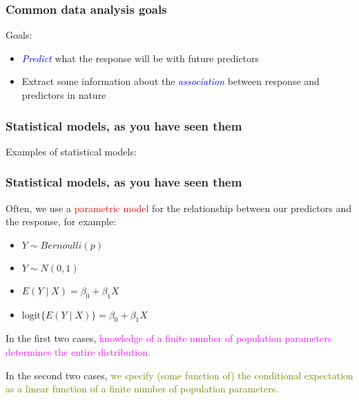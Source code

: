 \documentclass[12pt, 
hyperref={colorlinks=true, linkcolor=blue, urlcolor=cyan}]{beamer}
\begin{document}
\begin{frame}
\frametitle{Common data analysis goals}
\begin{center}
\end{center}

Goals: \vspace{-0.3cm}
\begin{itemize}
\item \textcolor{blue}{\textit{Predict}} what the response will be with future predictors
\item Extract some information about the \textcolor{blue}{\textit{association}} between response and predictors in nature
\end{itemize} 
\end{frame}

\begin{frame}
\frametitle{Statistical models, as you have seen them}
Examples of statistical models: \vspace{6cm}
\end{frame}

\begin{frame}
\frametitle{Statistical models, as you have seen them}
Often, we use a \textcolor{red}{parametric model} for the relationship between our predictors and the response, for example: \vspace{-0.3cm}
\begin{itemize}
\item $Y \sim Bernoulli(p)$ 
\item $Y \sim N(0, 1)$
\item $E(Y \mid X) = \beta_0 + \beta_1 X$ 
\item $\text{logit} \{E(Y \mid X)\} = \beta_0 + \beta_1 X$
\end{itemize}

In the first two cases, \textcolor{magenta}{knowledge of a finite number of population parameters determines the entire distribution.}

In the second two cases, \textcolor{olive}{we specify (some function of) the conditional expectation as a linear function of a finite number of population parameters.}
\end{frame}
\end{document}
